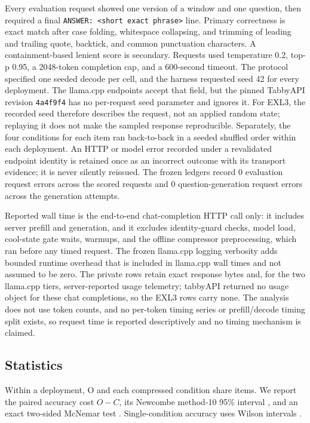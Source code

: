 \documentclass[11pt]{article}
\newcommand{\q}[1]{\texttt{#1}}
\begin{document}
Every evaluation request showed one version of a window and one question, then
required a final \q{ANSWER: <short exact phrase>} line. Primary correctness is
exact match after case folding, whitespace collapsing, and trimming of
leading and trailing quote, backtick, and common punctuation characters. A
containment-based lenient score is secondary. Requests used temperature 0.2,
top-p 0.95, a 2048-token completion cap, and a 600-second timeout. The protocol
specified one seeded decode per cell, and the harness requested seed 42 for
every deployment. The llama.cpp endpoints accept that field, but the pinned
TabbyAPI revision \q{4a4f9f4} has no per-request seed parameter and ignores it.
For EXL3, the recorded seed therefore describes the request, not an applied
random state; replaying it does not make the sampled response reproducible.
Separately, the four conditions for each item ran back-to-back in a seeded shuffled order
within each deployment. An HTTP or model error recorded under a revalidated
endpoint identity is retained once as an incorrect outcome with its transport
evidence; it is never silently reissued.
The frozen ledgers record 0 evaluation request errors across the
\PtwoNRequests{} scored requests and 0 question-generation request
errors across the generation attempts.

Reported wall time is the end-to-end chat-completion HTTP call only: it
includes server prefill and generation, and it excludes identity-guard checks,
model load, cool-state gate waits, warmups, and the offline compressor
preprocessing, which ran before any timed request. The frozen llama.cpp
logging verbosity adds bounded runtime overhead that is included in llama.cpp
wall times and not assumed to be zero. The private rows retain exact response
bytes and, for the two llama.cpp tiers, server-reported usage telemetry;
tabbyAPI returned no usage object for these chat completions, so the EXL3 rows
carry none. The analysis does not use token counts, and no per-token timing
series or prefill/decode timing split exists,
so request time is reported descriptively and no timing mechanism is claimed.

\subsection{Statistics}\label{sec:statistics}

Within a deployment, O and each compressed condition share items. We report
the paired accuracy cost $O-C$, its Newcombe method-10 95\% interval
\citep{newcombe1998paired}, and an exact two-sided McNemar test
\citep{mcnemar1947}. Single-condition accuracy uses Wilson intervals
\citep{wilson1927}.
\end{document}
